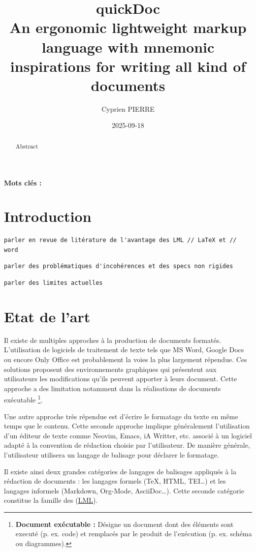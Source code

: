 \documentclass[a4paper,12pt]{article}
\author{Cyprien PIERRE \orcidlink{0009-0009-9040-6795}}
\date{2025-09-18}
\title{quickDoc\\\medskip
\large An ergonomic lightweight markup language with mnemonic inspirations for writing all kind of documents}
\begin{document}
\maketitle
\begin{abstract}
Abstract
\end{abstract}

\textbf{Mots clés : }
\section{Introduction}
\label{sec:orgef1d8bc}

\begin{verbatim}
parler en revue de litérature de l'avantage des LML // LaTeX et // word
\end{verbatim}

\begin{verbatim}
parler des problématiques d'incohérences et des specs non rigides
\end{verbatim}

\begin{verbatim}
parler des limites actuelles
\end{verbatim}
\section{Etat de l'art}
\label{sec:org329d5a4}
Il existe de multiples approches à la production de documents formatés. L'utilisation de logiciels de traitement de texte tels que MS Word, Google Docs ou encore Only Office est probablement la voies la plus largement répendue. Ces solutions proposent des environnements graphiques qui présentent aux utilisateurs les modifications qu'ils peuvent apporter à leurs document. Cette approche a des limitation notamment dans la réalisations de documents exécutable \footnote{\textbf{Document exécutable :} Désigne un document dont des éléments sont executé (p. ex. code) et remplacés par le produit de l'exécution (p. ex. schéma ou diagrammes).}.

Une autre approche très répendue est d'écrire le formatage du texte en même temps que le contenu. Cette seconde approche implique généralement l'utilisation d'un éditeur de texte comme Neovim, Emacs, iA Writter, etc. associé à un logiciel adapté à la convention de rédaction choisie par l'utilisateur. De manière générale, l'utilisateur utilisera un langage de balisage pour déclarer le formatage.

Il existe ainsi deux grandes catégories de langages de balisages appliqués à la rédaction de documents : les langages formels (\TeX{}, HTML, TEI\ldots{}) et les langages informels (Markdown, Org-Mode, AsciiDoc\ldots{})\autocite{leonardGuidanceMarkdownDesign2016}. Cette seconde catégorie constitue la famille des  (\protect\hyperlink{gls-1}{\label{gls-1-use-1}LML}).
\end{document}
